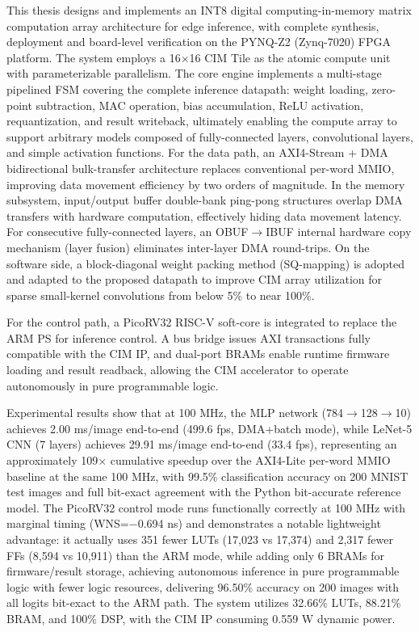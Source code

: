 \documentclass[12pt, a4paper]{article}
\begin{document}
This thesis designs and implements an INT8 digital computing-in-memory matrix computation array architecture for edge inference, with complete synthesis, deployment and board-level verification on the PYNQ-Z2 (Zynq-7020) FPGA platform. The system employs a 16$\times$16 CIM Tile as the atomic compute unit with parameterizable parallelism. The core engine implements a multi-stage pipelined FSM covering the complete inference datapath: weight loading, zero-point subtraction, MAC operation, bias accumulation, ReLU activation, requantization, and result writeback, ultimately enabling the compute array to support arbitrary models composed of fully-connected layers, convolutional layers, and simple activation functions. For the data path, an AXI4-Stream + DMA bidirectional bulk-transfer architecture replaces conventional per-word MMIO, improving data movement efficiency by two orders of magnitude. In the memory subsystem, input/output buffer double-bank ping-pong structures overlap DMA transfers with hardware computation, effectively hiding data movement latency. For consecutive fully-connected layers, an OBUF$\rightarrow$IBUF internal hardware copy mechanism (layer fusion) eliminates inter-layer DMA round-trips. On the software side, a block-diagonal weight packing method (SQ-mapping) is adopted and adapted to the proposed datapath to improve CIM array utilization for sparse small-kernel convolutions from below 5\% to near 100\%.

For the control path, a PicoRV32 RISC-V soft-core is integrated to replace the ARM PS for inference control. A bus bridge issues AXI transactions fully compatible with the CIM IP, and dual-port BRAMs enable runtime firmware loading and result readback, allowing the CIM accelerator to operate autonomously in pure programmable logic.

Experimental results show that at 100 MHz, the MLP network (784$\rightarrow$128$\rightarrow$10) achieves 2.00 ms/image end-to-end (499.6 fps, DMA+batch mode), while LeNet-5 CNN (7 layers) achieves 29.91 ms/image end-to-end (33.4 fps), representing an approximately 109$\times$ cumulative speedup over the AXI4-Lite per-word MMIO baseline at the same 100 MHz, with 99.5\% classification accuracy on 200 MNIST test images and full bit-exact agreement with the Python bit-accurate reference model. The PicoRV32 control mode runs functionally correctly at 100 MHz with marginal timing (WNS=$-$0.694 ns) and demonstrates a notable lightweight advantage: it actually uses 351 fewer LUTs (17,023 vs 17,374) and 2,317 fewer FFs (8,594 vs 10,911) than the ARM mode, while adding only 6 BRAMs for firmware/result storage, achieving autonomous inference in pure programmable logic with fewer logic resources, delivering 96.50\% accuracy on 200 images with all logits bit-exact to the ARM path. The system utilizes 32.66\% LUTs, 88.21\% BRAM, and 100\% DSP, with the CIM IP consuming 0.559 W dynamic power.
\end{document}
